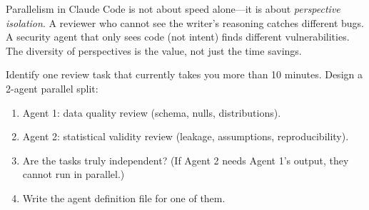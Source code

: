 \begin{keyinsight}
Parallelism in Claude Code is not about speed alone---it is about
\emph{perspective isolation}. A reviewer who cannot see the writer's
reasoning catches different bugs. A security agent that only sees code
(not intent) finds different vulnerabilities. The diversity of perspectives
is the value, not just the time savings.
\end{keyinsight}

\begin{trybox}
Identify one review task that currently takes you more than 10 minutes.
Design a 2-agent parallel split:
\begin{enumerate}
  \item Agent 1: data quality review (schema, nulls, distributions).
  \item Agent 2: statistical validity review (leakage, assumptions, reproducibility).
  \item Are the tasks truly independent? (If Agent 2 needs Agent 1's output,
    they cannot run in parallel.)
  \item Write the agent definition file for one of them.
\end{enumerate}
\end{trybox}
